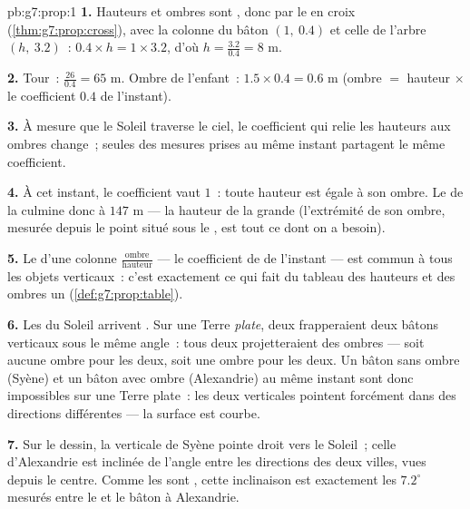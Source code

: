 \begin{solution}{pb:g7:prop:1}
\textbf{1.} Hauteurs et ombres sont , donc par le
 en croix (\cref{thm:g7:prop:cross}), avec la colonne du
bâton $(1,\ 0.4)$ et celle de l'arbre $(h,\ 3.2)$~:
$0.4 \times h = 1 \times 3.2$, d'où
$h = \frac{3.2}{0.4} = 8$ m.

\textbf{2.} Tour~: $\frac{26}{0.4} = 65$ m. Ombre de l'enfant~:
$1.5 \times 0.4 = 0.6$ m (ombre $=$ hauteur $\times$ le coefficient
$0.4$ de l'instant).

\textbf{3.} À mesure que le Soleil traverse le ciel, le coefficient
qui relie les hauteurs aux ombres change~; seules des mesures prises
au même instant partagent le même coefficient.

\textbf{4.} À cet instant, le coefficient vaut $1$~: toute hauteur
est égale à son ombre. Le  de la  culmine donc à
$147$ m --- la hauteur de la grande  (l'extrémité de son
ombre, mesurée depuis le point situé sous le , est tout ce
dont on a besoin).

\textbf{5.} Le  d'une colonne
$\frac{\text{ombre}}{\text{hauteur}}$ --- le coefficient de
 de l'instant --- est commun à tous les objets
verticaux~: c'est exactement ce qui fait du tableau des hauteurs et
des ombres un 
(\cref{def:g7:prop:table}).

\textbf{6.} Les  du Soleil arrivent . Sur une Terre
\emph{plate}, deux   frapperaient deux bâtons
verticaux sous le même angle~: tous deux projetteraient des ombres
 --- soit aucune ombre pour les deux, soit une ombre
pour les deux. Un bâton sans ombre (Syène) et un bâton avec ombre
(Alexandrie) au même instant sont donc impossibles sur une Terre
plate~: les deux verticales pointent forcément dans des directions
différentes --- la surface est courbe.

\textbf{7.} Sur le dessin, la verticale de Syène pointe droit vers
le Soleil~; celle d'Alexandrie est inclinée de l'angle entre les
directions des deux villes, vues depuis le centre. Comme les 
sont , cette inclinaison est exactement les $7.2^\circ$
mesurés entre le  et le bâton à Alexandrie.


\end{solution}
